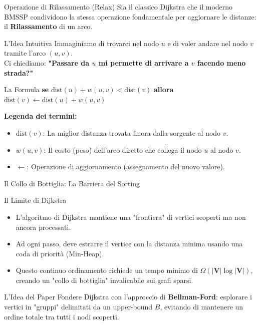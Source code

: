 \documentclass[aspectratio=169]{beamer}
\begin{document}
\begin{frame}{Operazione di Rilassamento (Relax)}
    Sia il classico Dijkstra che il moderno BMSSP condividono la stessa operazione fondamentale per aggiornare le distanze: il \textbf{Rilassamento} di un arco.
    \vspace{0.2cm}

    \begin{block}{L'Idea Intuitiva}
        Immaginiamo di trovarci nel nodo $u$ e di voler andare nel nodo $v$ tramite l'arco $(u,v)$. \\
        Ci chiediamo: \textbf{"Passare da $u$ mi permette di arrivare a $v$ facendo meno strada?"}
    \end{block}

    \begin{exampleblock}{La Formula}
        \centering
        \textbf{se} $\text{dist}(u) + w(u,v) < \text{dist}(v)$ \textbf{allora} $\text{dist}(v) \gets \text{dist}(u) + w(u,v)$
    \end{exampleblock}

    \small
    \textbf{Legenda dei termini:}
    \begin{itemize}
        \item \textbf{$\text{dist}(v)$}: La miglior distanza trovata finora dalla sorgente al nodo $v$.
        \item \textbf{$w(u,v)$}: Il costo (peso) dell'arco diretto che collega il nodo $u$ al nodo $v$.
        \item \textbf{$\gets$}: Operazione di aggiornamento (assegnamento del nuovo valore).
    \end{itemize}
\end{frame}

\begin{frame}{Il Collo di Bottiglia: La Barriera del Sorting}
    \begin{block}{Il Limite di Dijkstra}
        \begin{itemize}
            \item L'algoritmo di Dijkstra mantiene una "frontiera" di vertici scoperti ma non ancora processati.
            \item Ad ogni passo, deve estrarre il vertice con la distanza minima usando una coda di priorità (Min-Heap).
            \item Questo continuo ordinamento richiede un tempo minimo di $\Omega(\vert \mathbf{V}\vert \log \vert \mathbf{V}\vert)$, creando un "collo di bottiglia" invalicabile sui grafi sparsi.
        \end{itemize}
    \end{block}
    \begin{block}{L'Idea del Paper}
        Fondere Dijkstra con l'approccio di \textbf{Bellman-Ford}: esplorare i vertici in "gruppi" delimitati da un upper-bound $B$, evitando di mantenere un ordine totale tra tutti i nodi scoperti.
    \end{block}
\end{frame}
\end{document}
